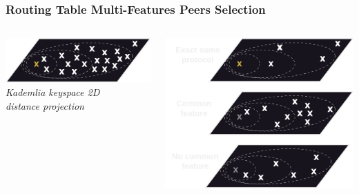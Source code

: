 \documentclass{../pl-slide}
\begin{document}
\begin{frame}
\frametitle{Routing Table Multi-Features Peers Selection}
\begin{columns}[onlytextwidth]
	\begin{column}{0.49\textwidth}
	    		\begin{center}
        		\includegraphics[scale=.35]{resources/1-plan-buckets.png}\\
        		\medskip
        		\textit{Kademlia keyspace 2D\\distance projection}
        		\end{center}
	\end{column}
	\begin{column}{0.49\textwidth}
    		\begin{center}
        		\includegraphics[scale=.26]{resources/dimensions.png}
    		\end{center}
	\end{column}

\end{columns}
\end{frame}
\end{document}
